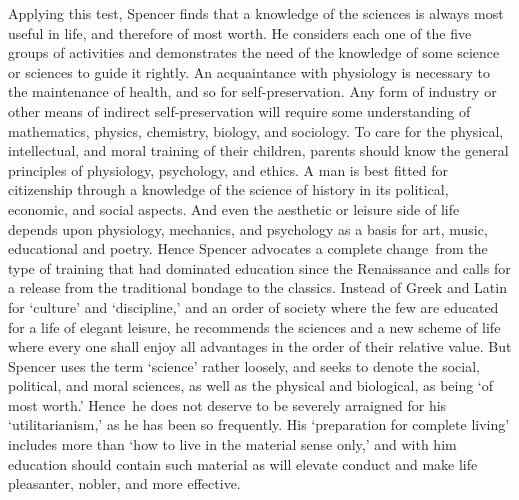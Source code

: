 \documentclass[]{book}
\begin{document}
Applying this test, Spencer finds that a knowledge of the sciences is always most useful in life, and therefore of most worth. He considers each one of the five groups of activities and demonstrates the need of the knowledge of some science or sciences to guide it rightly. An acquaintance with physiology is necessary to the maintenance of health, and so for self-preservation. Any form of industry or other means of indirect self-preservation will require some understanding of mathematics, physics, chemistry, biology, and sociology. To care for the physical, intellectual, and moral training of their children, parents should know the general principles of physiology, psychology, and ethics. A man is best fitted for citizenship through a knowledge of the science of history in its political, economic, and social aspects. And even the aesthetic or leisure side of life depends upon physiology, mechanics, and psychology as a basis for art, music, educational and poetry. Hence Spencer advocates a complete change~from the type of training that had dominated education since the Renaissance and calls for a release from the traditional bondage to the classics. Instead of Greek and Latin for `culture' and `discipline,' and an order of society where the few are educated for a life of elegant leisure, he recommends the sciences and a new scheme of life where every one shall enjoy all advantages in the order of their relative value. But Spencer uses the term `science' rather loosely, and seeks to denote the social, political, and moral sciences, as well as the physical and biological, as being `of most worth.' Hence~he does not deserve to be severely arraigned for his `utilitarianism,' as he has been so frequently. His `preparation for complete living' includes more than `how to live in the material sense only,' and with him education should contain such material as will elevate conduct and make life pleasanter, nobler, and more effective.
\end{document}
